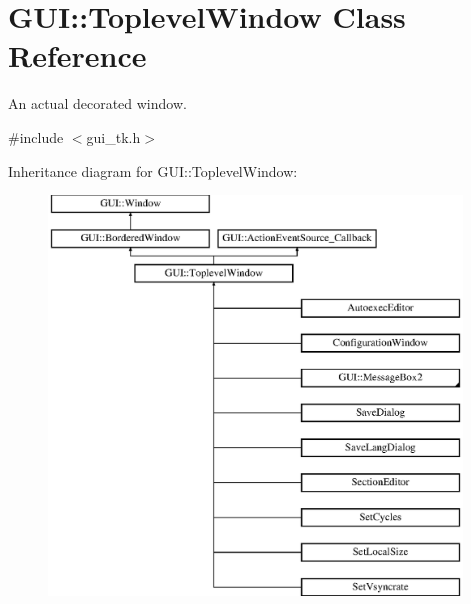 \hypertarget{classGUI_1_1ToplevelWindow}{\section{G\-U\-I\-:\-:Toplevel\-Window Class Reference}
\label{classGUI_1_1ToplevelWindow}
}


An actual decorated window.  




{\ttfamily \#include $<$gui\-\_\-tk.\-h$>$}

Inheritance diagram for G\-U\-I\-:\-:Toplevel\-Window\-:\begin{figure}[H]
\begin{center}
\leavevmode
\includegraphics[height=10.616114cm]{classGUI_1_1ToplevelWindow}
\end{center}
\end{figure}
